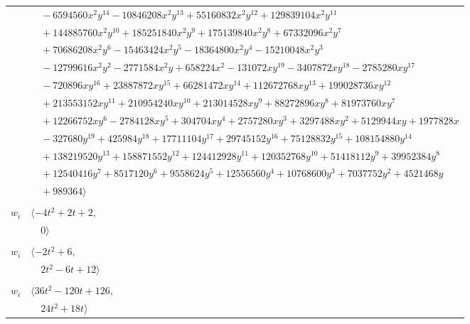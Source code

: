 \documentclass[11pt]{article}
\begin{document}
\begin{longtable}{@{}ll@{}}
 & $\quad -6594560x^{2}y^{14}-10846208x^{2}y^{13}+55160832x^{2}y^{12}+129839104x^{2}y^{11}$\\
 & $\quad +144885760x^{2}y^{10}+185251840x^{2}y^{9}+175139840x^{2}y^{8}+67332096x^{2}y^{7}$\\
 & $\quad +70686208x^{2}y^{6}-15463424x^{2}y^{5}-18364800x^{2}y^{4}-15210048x^{2}y^{3}$\\
 & $\quad -12799616x^{2}y^{2}-2771584x^{2}y+658224x^{2}-131072xy^{19}-3407872xy^{18}-2785280xy^{17}$\\
 & $\quad -720896xy^{16}+23887872xy^{15}+66281472xy^{14}+112672768xy^{13}+199028736xy^{12}$\\
 & $\quad +213553152xy^{11}+210954240xy^{10}+213014528xy^{9}+88272896xy^{8}+81973760xy^{7}$\\
 & $\quad +12266752xy^{6}-2784128xy^{5}+304704xy^{4}+2757280xy^{3}+3297488xy^{2}+5129944xy+1977828x$\\
 & $\quad -327680y^{19}+425984y^{18}+17711104y^{17}+29745152y^{16}+75128832y^{15}+108154880y^{14}$\\
 & $\quad +138219520y^{13}+158871552y^{12}+124412928y^{11}+120352768y^{10}+51418112y^{9}+39952384y^{8}$\\
 & $\quad +12540416y^{7}+8517120y^{6}+9558624y^{5}+12556560y^{4}+10768600y^{3}+7037752y^{2}+4521468y$\\
 & $\quad +989364\rangle$\\
\addlinespace[2pt]
\multicolumn{2}{@{}p{0.97\textwidth}@{}}{$i=19$, $D_i=2$, $\rho_{ij}$: $10{:}2, \allowbreak 15{:}1, \allowbreak 18{:}1, \allowbreak 34{:}1, \allowbreak 50{:}1$}\\
$w_i$ & $\langle -4t^{2}+2t+2,$\\
 & $\quad 0\rangle$\\
\addlinespace[2pt]
\multicolumn{2}{@{}p{0.97\textwidth}@{}}{$i=20$, $D_i=2$, $\rho_{ij}$: $2{:}1, \allowbreak 9{:}1, \allowbreak 26{:}1, \allowbreak 30{:}1, \allowbreak 40{:}2, \allowbreak 48{:}2$}\\
$w_i$ & $\langle -2t^{2}+6,$\\
 & $\quad 2t^{2}-6t+12\rangle$\\
\addlinespace[2pt]
\multicolumn{2}{@{}p{0.97\textwidth}@{}}{$i=21$, $D_i=8$, $\rho_{ij}$: $1{:}2, \allowbreak 3{:}2, \allowbreak 5{:}2, \allowbreak 9{:}1, \allowbreak 11{:}1, \allowbreak 28{:}2, \allowbreak 30{:}2, \allowbreak 31{:}2, \allowbreak 48{:}1, \allowbreak 49{:}2$}\\
$w_i$ & $\langle 36t^{2}-120t+126,$\\
 & $\quad 24t^{2}+18t\rangle$\\

\end{longtable}
\end{document}
